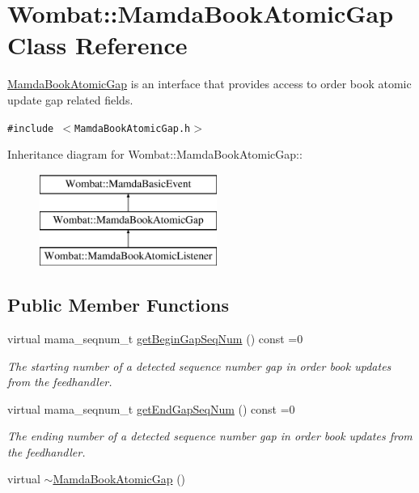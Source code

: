 \hypertarget{classWombat_1_1MamdaBookAtomicGap}{
\section{Wombat::Mamda\-Book\-Atomic\-Gap Class Reference}
\label{classWombat_1_1MamdaBookAtomicGap}
}
\hyperlink{classWombat_1_1MamdaBookAtomicGap}{Mamda\-Book\-Atomic\-Gap} is an interface that provides access to order book atomic update gap related fields.  


{\tt \#include $<$Mamda\-Book\-Atomic\-Gap.h$>$}

Inheritance diagram for Wombat::Mamda\-Book\-Atomic\-Gap::\begin{figure}[H]
\begin{center}
\leavevmode
\includegraphics[height=3cm]{classWombat_1_1MamdaBookAtomicGap}
\end{center}
\end{figure}
\subsection*{Public Member Functions}
\begin{CompactItemize}
\item 
virtual mama\_\-seqnum\_\-t \hyperlink{classWombat_1_1MamdaBookAtomicGap_8023460971323b5c43af54d8a39592e2}{get\-Begin\-Gap\-Seq\-Num} () const =0
\begin{CompactList}\small\item\em The starting number of a detected sequence number gap in order book updates from the feedhandler. \item\end{CompactList}\item 
virtual mama\_\-seqnum\_\-t \hyperlink{classWombat_1_1MamdaBookAtomicGap_54152f40fa9bc51cb2b67d3b64a911c3}{get\-End\-Gap\-Seq\-Num} () const =0
\begin{CompactList}\small\item\em The ending number of a detected sequence number gap in order book updates from the feedhandler. \item\end{CompactList}\item 
virtual \hyperlink{classWombat_1_1MamdaBookAtomicGap_b429b9d3e658e1cd7f05e3c9cb194298}{$\sim$Mamda\-Book\-Atomic\-Gap} ()
\end{CompactItemize}


